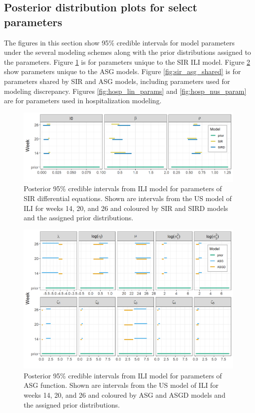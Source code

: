 \documentclass[ba]{imsart}
\theoremstyle{plain}
\theoremstyle{definition}
\theoremstyle{remark}
\begin{document}
\begin{supplement}
\section{Posterior distribution plots for select parameters}
\label{app:C_post}

The figures in this section show 95\% credible intervals for model parameters 
under the several modeling schemes along with the prior distributions assigned
to the parameters. Figure \ref{fig:posterior_theta_sir} is for parameters 
unique to the SIR ILI model. Figure \ref{fig:posterior_theta}  
show parameters unique to the ASG models. 
Figure \ref{fig:sir_asg_shared} is for parameters shared by SIR and ASG 
models, including parameters used for modeling discrepancy. Figures 
\ref{fig:hosp_lin_params} and \ref{fig:hosp_nus_param} are for parameters 
used in hospitalization modeling.


\begin{figure}[hbt!]
    \centering
    \includegraphics[scale=.6]{Images/posterior_sir.png}
    \caption{Posterior 95\% credible intervals from ILI model for 
    parameters of SIR differential equations. Shown are intervals 
    from the US model of ILI for weeks 14, 20, and 26 and coloured by 
    SIR and SIRD
    models and the assigned prior distributions.}
    \label{fig:posterior_theta_sir}
\end{figure}

\begin{figure}[hbt!]
    \centering
    \includegraphics[scale=.6]{Images/posterior_asg.png}
    \caption{Posterior 95\% credible intervals from ILI model for parameters of 
    ASG function. Shown are intervals from the US model of ILI for weeks 14, 
    20, and 26 and coloured by ASG and ASGD models and the assigned 
    prior distributions.}
    \label{fig:posterior_theta}
\end{figure}




\end{supplement}
\end{document}
